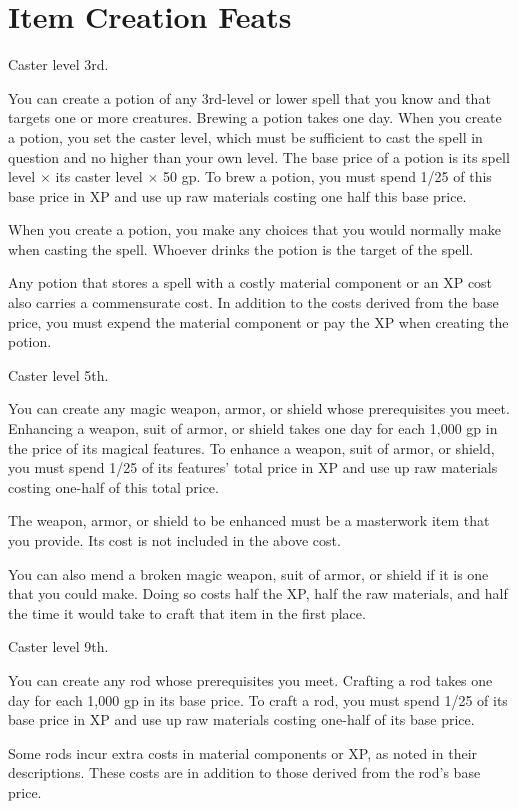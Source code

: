 \section{Item Creation Feats}

{Caster level 3rd.}
{You can create a potion of any 3rd-level or lower spell that you know and that targets one or more creatures. Brewing a potion takes one day. When you create a potion, you set the caster level, which must be sufficient to cast the spell in question and no higher than your own level. The base price of a potion is its spell level $\times$ its caster level $\times$ 50 gp. To brew a potion, you must spend 1/25 of this base price in XP and use up raw materials costing one half this base price.

When you create a potion, you make any choices that you would normally make when casting the spell. Whoever drinks the potion is the target of the spell.

Any potion that stores a spell with a costly material component or an XP cost also carries a commensurate cost. In addition to the costs derived from the base price, you must expend the material component or pay the XP when creating the potion.}

{Caster level 5th.}
{You can create any magic weapon, armor, or shield whose prerequisites you meet. Enhancing a weapon, suit of armor, or shield takes one day for each 1,000 gp in the price of its magical features. To enhance a weapon, suit of armor, or shield, you must spend 1/25 of its features’ total price in XP and use up raw materials costing one-half of this total price.

The weapon, armor, or shield to be enhanced must be a masterwork item that you provide. Its cost is not included in the above cost.

You can also mend a broken magic weapon, suit of armor, or shield if it is one that you could make. Doing so costs half the XP, half the raw materials, and half the time it would take to craft that item in the first place.}

{Caster level 9th.}
{You can create any rod whose prerequisites you meet. Crafting a rod takes one day for each 1,000 gp in its base price. To craft a rod, you must spend 1/25 of its base price in XP and use up raw materials costing one-half of its base price.

Some rods incur extra costs in material components or XP, as noted in their descriptions. These costs are in addition to those derived from the rod’s base price.}

